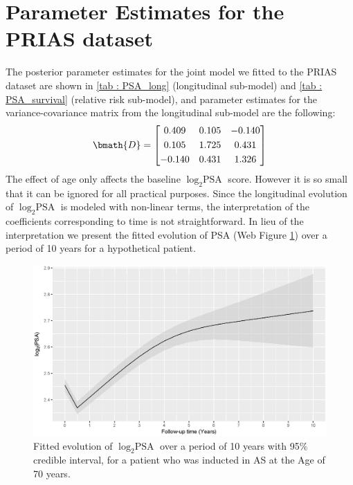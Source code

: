 
\section{Parameter Estimates for the PRIAS dataset}
\label{sec : param_estimates_jm_fit_prias}
The posterior parameter estimates for the joint model we fitted to the PRIAS dataset are shown in \ref{tab : PSA_long} (longitudinal sub-model) and \ref{tab : PSA_survival} (relative risk sub-model), and parameter estimates for the variance-covariance matrix from the longitudinal sub-model are the following:
\begin{equation*}
\bmath{D} = \begin{bmatrix}
       0.409 & 0.105 & -0.140 \\[0.3em]
       0.105 & 1.725 & 0.431 \\[0.3em]
       -0.140 & 0.431 & 1.326
     \end{bmatrix}
\end{equation*} 
The effect of age only affects the baseline $\log_2 \mbox{PSA}$ score. However it is so small that it can be ignored for all practical purposes. Since the longitudinal evolution of $\log_2 \mbox{PSA}$ is modeled with non-linear terms, the interpretation of the coefficients corresponding to time is not straightforward. In lieu of the interpretation we present the fitted evolution of PSA (Web Figure \ref{fig : fitted_trend_psa}) over a period of 10 years for a hypothetical patient.

\begin{figure}[!htb]
\centerline{\includegraphics[width=\columnwidth]{images/fitted_trend_psa.eps}}
\caption{Fitted evolution of $\log_2 \mbox{PSA}$ over a period of 10 years with 95\% credible interval, for a patient who was inducted in AS at the Age of 70 years.}
\label{fig : fitted_trend_psa}
\end{figure}

